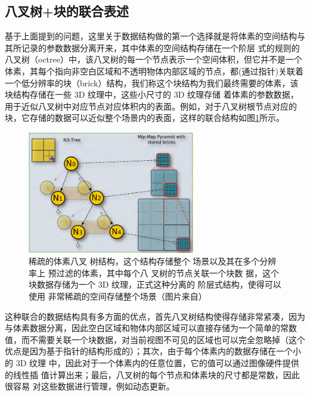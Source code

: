 \subsection{八叉树+块的联合表述}\label{sec:vct-block-plus-octree}
基于上面提到的问题，这里关于数据结构做的第一个选择就是将体素的空间结构与其所记录的参数数据分离开来，其中体素的空间结构存储在一个阶层 式的规则的八叉树（octree）中，该八叉树的每一个节点表示一个空间体积，但它并不是一个体素，其每个指向非空白区域和不透明物体内部区域的节点，都(通过指针)关联着一个低分辨率的块（brick）结构，我们称这个块结构为我们最终需要的体素，该块结构存储在一些 3D 纹理中，这些小尺寸的 3D 纹理存储 着体素的参数数据，用于近似八叉树中对应节点对应体积内的表面。例如，对于八叉树根节点对应的块，它存储的数据可以近似整个场景内的表面，这样的联合结构如图\ref{f:vct-octree}所示。

\begin{figure}
	\sidecaption
	\includegraphics[width=0.65\textwidth]{figures/vct/vct-octree}
	\caption{稀疏的体素八叉 树结构，这个结构存储整个 场景以及其在多个分辨率上 预过滤的体素，其中每个八 叉树的节点关联一个块数 据，这个块数据存储为一个 3D 纹理，正式这种分离的 阶层式结构，使得可以使用 非常稀疏的空间存储整个场景（图片来自\cite{a:Gigavoxels:Avoxelbasedrenderingpipelineforefficientexplorationoflargeanddetailedscenes}）}
	\label{f:vct-octree}
\end{figure}

这种联合的数据结构具有多方面的优点，首先八叉树结构使得存储非常紧凑，因为与体素数据分离，因此空白区域和物体内部区域可以直接存储为一个简单的常数值，而不需要关联一个块数据，对当前视图不可见的区域也可以完全忽略掉（这个优点是因为基于指针的结构形成的）；其次，由于每个体素内的数据存储在一个小的 3D 纹理 中，因此对于一个体素内的任意位置，它的值可以通过图像硬件提供的线性插 值计算出来；最后，八叉树的每个节点和体素块的尺寸都是常数，因此很容易 对这些数据进行管理，例如动态更新。



